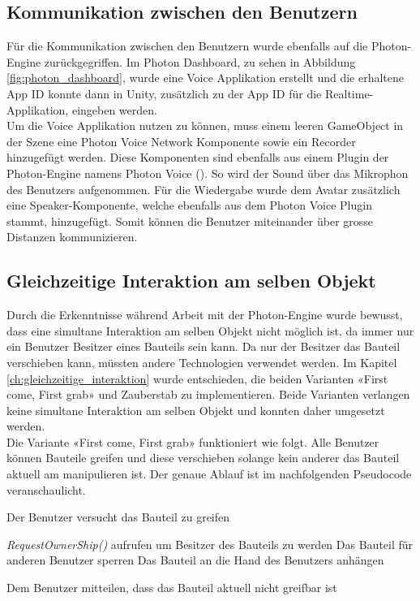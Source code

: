 \subsection{Kommunikation zwischen den Benutzern}

Für die Kommunikation zwischen den Benutzern wurde ebenfalls auf die Photon-Engine zurückgegriffen. Im Photon Dashboard, zu sehen in Abbildung \ref{fig:photon_dashboard}, wurde eine Voice Applikation erstellt und die erhaltene App ID konnte dann in Unity, zusätzlich zu der App ID für die Realtime-Applikation, eingeben werden. \\

\noindent Um die Voice Applikation nutzen zu können, muss einem leeren GameObject in der Szene eine \grqq Photon Voice Network\grqq{} Komponente sowie ein \grqq Recorder\grqq{} hinzugefügt werden. Diese Komponenten sind ebenfalls aus einem Plugin der Photon-Engine namens Photon Voice (\cite{noauthor_photon_2019-1}). So wird der Sound über das Mikrophon des Benutzers aufgenommen. Für die Wiedergabe wurde dem Avatar zusätzlich eine \grqq Speaker\grqq{}-Komponente, welche ebenfalls aus dem Photon Voice Plugin stammt, hinzugefügt. Somit können die Benutzer miteinander über grosse Distanzen kommunizieren. 

\subsection{Gleichzeitige Interaktion am selben Objekt}
\label{ch:gleichzeitige_interaktion_realisierung}

Durch die Erkenntnisse während Arbeit mit der Photon-Engine wurde bewusst, dass eine simultane Interaktion am selben Objekt nicht möglich ist, da immer nur ein Benutzer Besitzer eines Bauteils sein kann. Da nur der Besitzer das Bauteil verschieben kann, müssten andere Technologien verwendet werden. Im Kapitel \ref{ch:gleichzeitige_interaktion} wurde entschieden, die beiden Varianten «First come, First grab» und Zauberstab zu implementieren. Beide Varianten verlangen keine simultane Interaktion am selben Objekt und konnten daher umgesetzt werden. \\

\noindent Die Variante «First come, First grab» funktioniert wie folgt. Alle Benutzer können Bauteile greifen und diese verschieben solange kein anderer das Bauteil aktuell am manipulieren ist. Der genaue Ablauf ist im nachfolgenden Pseudocode veranschaulicht.

\begin{algorithm}
	Der Benutzer versucht das Bauteil zu greifen\;
	 {
		\textit{RequestOwnerShip()} aufrufen um Besitzer des Bauteils zu werden\;
		Das Bauteil für anderen Benutzer sperren\;
		Das Bauteil an die Hand des Benutzers anhängen\;
		
	}{
		Dem Benutzer mitteilen, dass das Bauteil aktuell nicht greifbar ist\;	
	}
\end{algorithm}

